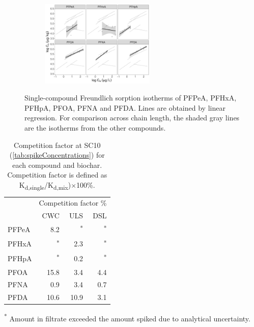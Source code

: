 \begin{figure}[t]\ContinuedFloat
        \begin{subfigure}[]{\linewidth}
            \centering
            \includegraphics[width=0.6\textwidth]{R/figs/CWC_facet_isotherm.pdf}
            \label{fig:CWC_isotherm}
        \end{subfigure}
        \caption{Single-compound Freundlich sorption isotherms of PFPeA, PFHxA, PFHpA, PFOA, PFNA and PFDA. Lines are obtained by linear regression. For comparison across chain length, the shaded gray lines are the isotherms from the other compounds.}
        \label{fig:sorption_isotherms_all}
\end{figure}

\begin{table}
\centering
\caption{Competition factor at SC10 (\cref{tab:spikeConcentrations}) for each compound and biochar. Competition factor is defined as K\textsubscript{d,single}/K\textsubscript{d,mix})$\times$100\%.}
\begin{threeparttable}
\label{tab:competition}
\begin{tabular}{lrrr}
\toprule
 & \multicolumn{3}{c}{Competition factor \%} \\ \cmidrule(l){2-4}
 & CWC & ULS & DSL \\ \midrule
PFPeA & 8.2 & \textsuperscript{*} & \textsuperscript{*} \\
PFHxA & \textsuperscript{*} & 2.3 & \textsuperscript{*} \\
PFHpA & \textsuperscript{*} & 0.2 & \textsuperscript{*} \\
PFOA & 15.8 & 3.4 & 4.4 \\
PFNA & 0.9 & 3.4 & 0.7 \\
PFDA & 10.6 & 10.9 & 3.1 \\ \bottomrule
\end{tabular}
\begin{tablenotes}
\item \textsuperscript{*} Amount in filtrate exceeded the amount spiked due to analytical uncertainty.
\end{tablenotes}
\end{threeparttable}
\end{table}

